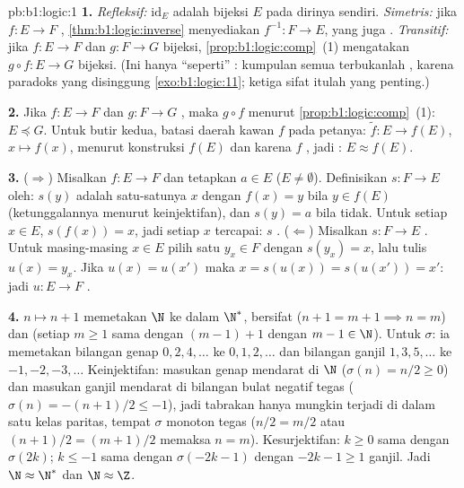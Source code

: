 \begin{solution}{pb:b1:logic:1}
\textbf{1.} \emph{Refleksif:} $\mathrm{id}_E$ adalah bijeksi $E$
pada dirinya sendiri. \emph{Simetris:} jika $f \colon E \to F$ ,
\cref{thm:b1:logic:inverse} menyediakan $f^{-1} \colon F \to E$, yang juga
. \emph{Transitif:} jika $f \colon E \to F$ dan $g \colon F
\to G$ bijeksi, \cref{prop:b1:logic:comp}~(1) mengatakan $g \circ f
\colon E \to G$ bijeksi. (Ini hanya ``seperti'' : kumpulan semua  terbukanlah , karena
paradoks yang disinggung \cref{exo:b1:logic:11}; ketiga sifat itulah
yang penting.)

\textbf{2.} Jika $f \colon E \to F$ dan $g \colon F \to G$
, maka $g \circ f$  menurut \cref{prop:b1:logic:comp}~(1):
$E \preceq G$. Untuk butir kedua, batasi daerah kawan $f$ pada petanya:
 $\tilde f \colon E \to f(E)$, $x \mapsto f(x)$,  menurut
konstruksi $f(E)$ dan  karena $f$ , jadi :
$E \approx f(E)$.

\textbf{3.} ($\Rightarrow$) Misalkan $f \colon E \to F$  dan
tetapkan $a \in E$ ($E \neq \emptyset$). Definisikan $s \colon F \to E$ oleh:
$s(y)$ adalah satu-satunya $x$ dengan $f(x) = y$ bila $y \in f(E)$
(ketunggalannya menurut keinjektifan), dan $s(y) = a$ bila tidak. Untuk setiap $x
\in E$, $s(f(x)) = x$, jadi setiap $x$ tercapai: $s$ .
($\Leftarrow$) Misalkan $s \colon F \to E$ . Untuk masing-masing $x \in
E$ pilih satu $y_x \in F$ dengan $s(y_x) = x$, lalu tulis $u(x) = y_x$. Jika
$u(x) = u(x')$ maka $x = s(u(x)) = s(u(x')) = x'$: jadi $u \colon E \to F$
.

\textbf{4.} $n \mapsto n + 1$ memetakan $\N$ ke dalam $\N^*$, bersifat 
($n + 1 = m + 1 \implies n = m$) dan  (setiap $m \geq 1$ sama dengan
$(m - 1) + 1$ dengan $m - 1 \in \N$). Untuk $\sigma$: ia memetakan bilangan
genap $0, 2, 4, \dots$ ke $0, 1, 2, \dots$ dan bilangan ganjil $1, 3,
5, \dots$ ke $-1, -2, -3, \dots$ Keinjektifan: masukan genap mendarat di
$\N$ ($\sigma(n) = n/2 \geq 0$) dan masukan ganjil mendarat di
bilangan bulat negatif tegas ($\sigma(n) = -(n+1)/2 \leq -1$), jadi
tabrakan hanya mungkin terjadi di dalam satu kelas paritas, tempat $\sigma$
monoton tegas ($n/2 = m/2$ atau $(n+1)/2 = (m+1)/2$ memaksa $n =
m$). Kesurjektifan: $k \geq 0$ sama dengan $\sigma(2k)$; $k \leq -1$ sama dengan
$\sigma(-2k - 1)$ dengan $-2k - 1 \geq 1$ ganjil. Jadi $\N \approx \N^*$ dan
$\N \approx \Z$.


\end{solution}
